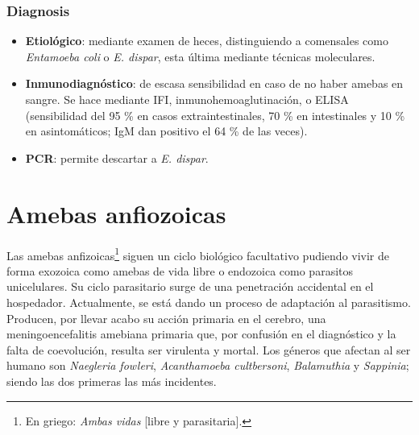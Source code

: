 \subsubsection{Diagnosis}
\begin{itemize}[itemsep=0pt,parsep=0pt,topsep=0pt,partopsep=0pt]
	\item\textbf{Etiológico}: mediante examen de heces, distinguiendo a comensales como \textit{Entamoeba coli} o \textit{E. dispar}, esta última mediante técnicas moleculares.
	\item\textbf{Inmunodiagnóstico}: de escasa sensibilidad en caso de no haber amebas en sangre. Se hace mediante IFI, inmunohemoaglutinación, o ELISA (sensibilidad del 95 \% en casos extraintestinales, 70 \% en intestinales y 10 \% en asintomáticos; IgM dan positivo el 64 \% de las veces).
	\item\textbf{PCR}: permite descartar a \textit{E. dispar}.
\end{itemize}
\newpage
\section{Amebas anfiozoicas}
Las amebas anfizoicas\footnote{En griego: \textit{Ambas vidas} [libre y parasitaria].} siguen un ciclo biológico facultativo pudiendo vivir de forma exozoica como amebas de vida libre o endozoica como parasitos unicelulares. Su ciclo parasitario surge de una penetración accidental en el hospedador. Actualmente, se está dando un proceso de adaptación al parasitismo. Producen, por llevar acabo su acción primaria en el cerebro, una meningoencefalitis amebiana primaria que, por confusión en el diagnóstico y la falta de coevolución, resulta ser virulenta y mortal. Los géneros que afectan al ser humano son \textit{Naegleria fowleri}, \textit{Acanthamoeba cultbersoni}, \textit{Balamuthia} y \textit{Sappinia}; siendo las dos primeras las más incidentes.

